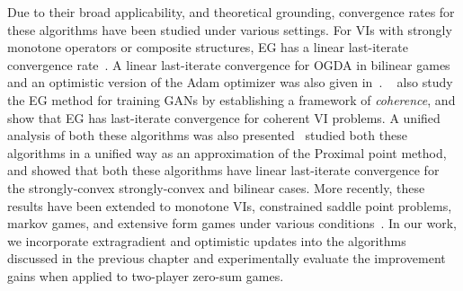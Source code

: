 Due to their broad applicability, and theoretical grounding, convergence rates for these algorithms
have been studied under various settings.
For VIs with strongly monotone operators or composite structures, EG has a linear last-iterate
convergence rate~\cite{tsenglinear1995}.
A linear last-iterate convergence for OGDA in bilinear games and an optimistic version of the Adam
optimizer was also given in~\cite{daskalakisTraining2018}.
~\cite{mertikopoulosOptimistic2019} also study the EG method for training GANs by establishing a framework of
\textit{coherence}, and show that EG has last-iterate convergence for coherent VI problems.
A unified analysis of both these algorithms was also presented~\cite{mokhtariUnified2020} studied
both these algorithms in a unified way as an approximation of the Proximal point method, and showed
that both these algorithms have linear last-iterate convergence for the strongly-convex
strongly-convex and bilinear cases.
More recently, these results have been extended to monotone VIs, constrained saddle point problems,
markov games, and extensive form games under various
conditions~\cite{weiLINEAR2021,cenFaster2022,caiTight2022,gorbunovExtragradient2022,gorbunovLastIterate2022}.
In our work, we incorporate extragradient and optimistic updates into the algorithms discussed in
the previous chapter and experimentally evaluate the improvement gains when applied to two-player
zero-sum games.


